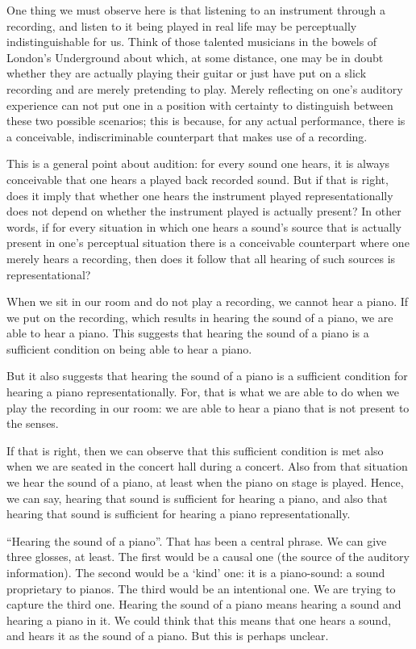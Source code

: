 \documentclass[sloppy, journal, git, bytitle, dodraft]{humapap}
\begin{document}
One thing we must observe here is that listening to an instrument through a recording, and listen to it being played in real life may be perceptually indistinguishable for us. Think of those talented musicians in the bowels of London's Underground about which, at some distance, one may be in doubt whether they are actually playing their guitar or just have put on a slick recording and are merely pretending to play. Merely reflecting on one's auditory experience can not put one in a position with certainty to distinguish between these two possible scenarios; this is because, for any actual performance, there is a conceivable, indiscriminable counterpart that makes use of a recording. 

This is a general point about audition: for every sound one hears, it is always conceivable that one hears a played back recorded sound. But if that is right, does it imply that whether one hears the instrument played representationally does not depend on whether the instrument played is actually present? In other words, if for every situation in which one hears a sound's source that is actually present in one's perceptual situation there is a conceivable counterpart where one merely hears a recording, then does it follow that all hearing of such sources is representational? 


When we sit in our room and do not play a recording, we cannot hear a piano. If we put on the recording, which results in hearing the sound of a piano, we are able to hear a piano. This suggests that hearing the sound of a piano is a sufficient condition on being able to hear a piano. 

But it also suggests that hearing the sound of a piano is a sufficient condition for hearing a piano representationally. For, that is what we are able to do when we play the recording in our room: we are able to hear a piano that is not present to the senses. 

If that is right, then we can observe that this sufficient condition is met also when we are seated in the concert hall during a concert. Also from that situation we hear the sound of a piano, at least when the piano on stage is played. Hence, we can say, hearing that sound is sufficient for hearing a piano, and also that hearing that sound is sufficient for hearing a piano representationally. 

``Hearing the sound of a piano''. That has been a central phrase. We can give three glosses, at least. The first would be a causal one (the source of the auditory information). The second would be a `kind' one: it is a piano-sound: a sound proprietary to pianos. The third would be an intentional one. We are trying to capture the third one. Hearing the sound of a piano means hearing a sound and hearing a piano in it. We could think that this means that one hears a sound, and hears it as the sound of a piano. But this is perhaps unclear. 
\end{document}
